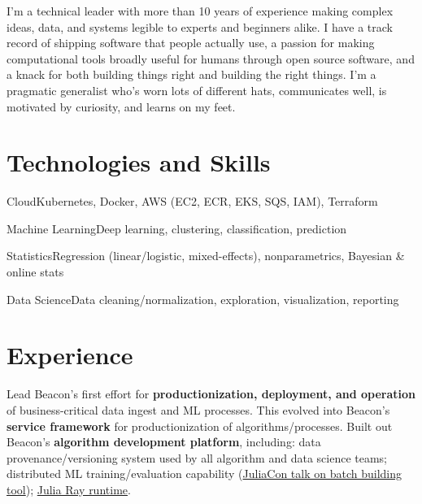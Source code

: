 \documentclass[10pt,colorlinks,urlcolor=gray]{moderncv}
\begin{document}
\makecvtitle

I'm a technical leader with more than 10 years of experience making complex ideas, data, and
systems legible to experts and beginners alike.  I have a track record of shipping software
that people actually use, a passion for making computational tools broadly useful for humans
through open source software, and a knack for both building things right and building the
right things.  I'm a pragmatic generalist who's worn lots of different hats, communicates
well, is motivated by curiosity, and learns on my feet.

\section{Technologies and Skills}

%
           {Cloud}{Kubernetes, Docker, AWS (EC2, ECR, EKS, SQS, IAM), Terraform}

%
           {Machine Learning}{Deep learning, clustering, classification, prediction}

%
           {Statistics}{Regression (linear/logistic, mixed-effects), nonparametrics,
                        Bayesian \& online stats}

%
           {Data Science}{Data cleaning/normalization, exploration, visualization, reporting}

\section{Experience}

 {Lead Beacon's first effort for \textbf{productionization,
    deployment, and operation} of business-critical data ingest and ML processes.  This
  evolved into Beacon's \textbf{service framework} for productionization of algorithms/processes.
  Built out Beacon's \textbf{algorithm development platform}, including: data
  provenance/versioning system used by all algorithm and data science teams; distributed ML
  training/evaluation capability
  (\href{https://www.youtube.com/watch?v=szjMOSuUYU4}{JuliaCon talk on batch building
    tool}); \href{https://github.com/beacon-biosignals/ray_core_worker_julia_jll.jl}{Julia
    Ray runtime}.}
\end{document}
